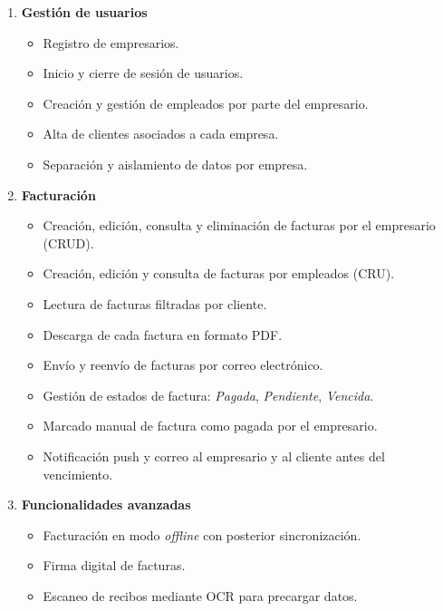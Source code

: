 \begin{large}

\begin{enumerate}[label=\textbf{RF\arabic*.}]
  \item \textbf{Gestión de usuarios}
        \begin{itemize}
          \item Registro de empresarios.
          \item Inicio y cierre de sesión de usuarios.
          \item Creación y gestión de empleados por parte del empresario.
          \item Alta de clientes asociados a cada empresa.
          \item Separación y aislamiento de datos por empresa.
        \end{itemize}

  \item \textbf{Facturación}
        \begin{itemize}
          \item Creación, edición, consulta y eliminación de facturas por el empresario (CRUD).
          \item Creación, edición y consulta de facturas por empleados (CRU).
          \item Lectura de facturas filtradas por cliente.
          \item Descarga de cada factura en formato PDF.
          \item Envío y reenvío de facturas por correo electrónico.
          \item Gestión de estados de factura: \emph{Pagada}, \emph{Pendiente}, \emph{Vencida}.
          \item Marcado manual de factura como pagada por el empresario.
          \item Notificación push y correo al empresario y al cliente antes del vencimiento.
        \end{itemize}

  \item \textbf{Funcionalidades avanzadas}
        \begin{itemize}
          \item Facturación en modo \emph{offline} con posterior sincronización.
          \item Firma digital de facturas.
          \item Escaneo de recibos mediante OCR para precargar datos.
        \end{itemize}


\end{enumerate}
\end{large}
